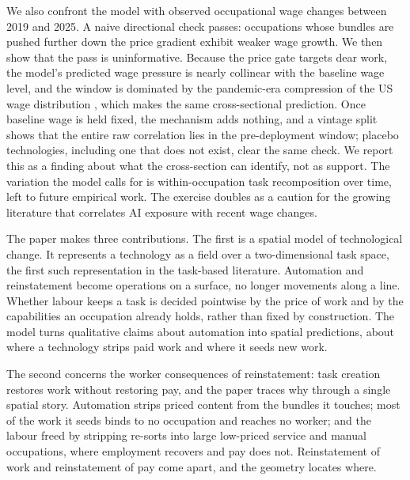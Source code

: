 \documentclass[12pt, a4paper]{article}
\begin{document}
We also confront the model with observed occupational wage changes
between 2019 and 2025. A naive directional check passes: occupations
whose bundles are pushed further down the price gradient exhibit weaker
wage growth. We then show that the pass is uninformative. Because the
price gate targets dear work, the model's predicted wage pressure is
nearly collinear with the baseline wage level, and the window is
dominated by the pandemic-era compression of the US wage distribution
\parencite{autor2023compression}, which makes the same cross-sectional
prediction. Once baseline wage is held fixed, the mechanism adds
nothing, and a vintage split shows that the entire raw correlation lies
in the pre-deployment window; placebo technologies, including one that
does not exist, clear the same check. We report this as a finding about what the
cross-section can identify, not as support. The variation the model
calls for is within-occupation task recomposition over time, left to
future empirical work. The exercise doubles as a caution for the growing
literature that correlates AI exposure with recent wage changes.

The paper makes three contributions. The first is a spatial model of
technological change. It represents a technology as a field over a
two-dimensional task space, the first such representation in the
task-based literature. Automation and reinstatement become operations
on a surface, no longer movements along a line. Whether labour keeps a
task is decided pointwise by the price of work and by the capabilities
an occupation already holds, rather than fixed by construction. The
model turns qualitative claims about automation into spatial
predictions, about where a technology strips paid work and where it
seeds new work.

The second concerns the
worker consequences of reinstatement: task creation restores work
without restoring pay, and the paper traces why through a single spatial
story. Automation strips priced content from the bundles it touches;
most of the work it seeds binds to no occupation and reaches no worker;
and the labour freed by stripping re-sorts into large low-priced
service and manual occupations, where employment recovers and pay does
not. Reinstatement of work and
reinstatement of pay come apart, and the geometry locates where.
\end{document}
